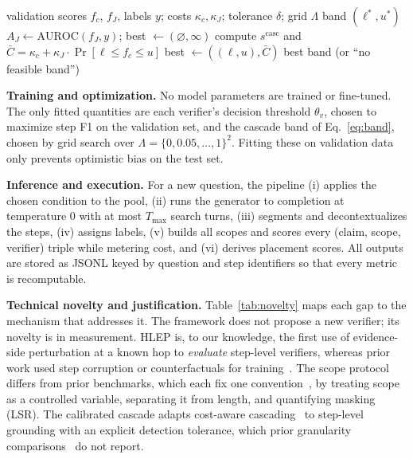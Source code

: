 \documentclass[conference]{IEEEtran}
\begin{document}
\begin{algorithm}[t]
\caption{Cascade band calibration}\label{alg:cascade}
\begin{algorithmic}[1]
\Require validation scores $f_c$, $f_J$, labels $y$; costs $\kappa_c,\kappa_J$; tolerance $\delta$; grid $\Lambda$
\Ensure band $(\ell^{*},u^{*})$
\State $A_J\gets\mathrm{AUROC}(f_J,y)$; best $\gets(\varnothing,\infty)$
  \State compute $s^{\mathrm{casc}}$ and $\bar{C}=\kappa_c+\kappa_J\cdot\Pr[\ell\le f_c\le u]$
   best $\gets((\ell,u),\bar{C})$
  \EndIf
\EndFor
\State \Return best band (or ``no feasible band'')
\end{algorithmic}
\end{algorithm}

\textbf{Training and optimization.} No model parameters are trained or fine-tuned. The only fitted quantities are each verifier's decision threshold $\theta_v$, chosen to maximize step F1 on the validation set, and the cascade band of Eq.~\eqref{eq:band}, chosen by grid search over $\Lambda=\{0,0.05,\dots,1\}^2$. Fitting these on validation data only prevents optimistic bias on the test set.

\textbf{Inference and execution.} For a new question, the pipeline (i) applies the chosen condition to the pool, (ii) runs the generator to completion at temperature 0 with at most $T_{\max}$ search turns, (iii) segments and decontextualizes the steps, (iv) assigns labels, (v) builds all scopes and scores every (claim, scope, verifier) triple while metering cost, and (vi) derives placement scores. All outputs are stored as JSONL keyed by question and step identifiers so that every metric is recomputable.

\textbf{Technical novelty and justification.} Table~\ref{tab:novelty} maps each gap to the mechanism that addresses it. The framework does not propose a new verifier; its novelty is in measurement. HLEP is, to our knowledge, the first use of evidence-side perturbation at a known hop to \emph{evaluate} step-level verifiers, whereas prior work used step corruption or counterfactuals for training~\cite{kwon2026safe,chu2026locally}. The scope protocol differs from prior benchmarks, which each fix one convention~\cite{jacovi2024reveal,ji2026stepgap,pham2026grace,chu2026locally}, by treating scope as a controlled variable, separating it from length, and quantifying masking (LSR). The calibrated cascade adapts cost-aware cascading~\cite{chen2023frugalgpt} to step-level grounding with an explicit detection tolerance, which prior granularity comparisons~\cite{jacovi2024reveal,pham2026grace} do not report.
\end{document}
